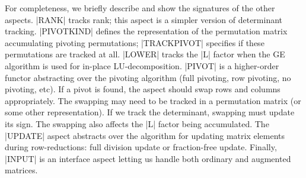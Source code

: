 \documentclass{elsart}
\begin{document}
For completeness, we briefly describe and show the signatures of the
other aspects. |RANK| tracks rank; this aspect is a simpler
version of determinant tracking. |PIVOTKIND| defines the
representation of the permutation matrix accumulating pivoting
permutations; |TRACKPIVOT| specifies if these permutations are
tracked at all. |LOWER| tracks the |L| factor when the GE algorithm is
used for in-place LU-decomposition. |PIVOT| is a higher-order
functor abstracting over the pivoting algorithm (full pivoting, row
pivoting, no pivoting, etc). If a pivot is found, the aspect should swap
rows and columns appropriately. The swapping may need to be tracked in
a permutation matrix (or some other representation). If we track the
determinant, swapping must update its sign. The
swapping also affects the |L| factor being accumulated. The
|UPDATE| aspect abstracts over the algorithm for updating matrix
elements during row-reductions: full division update or fraction-free
update. Finally, |INPUT| is an interface aspect letting us handle both
ordinary and augmented matrices.
\end{document}
